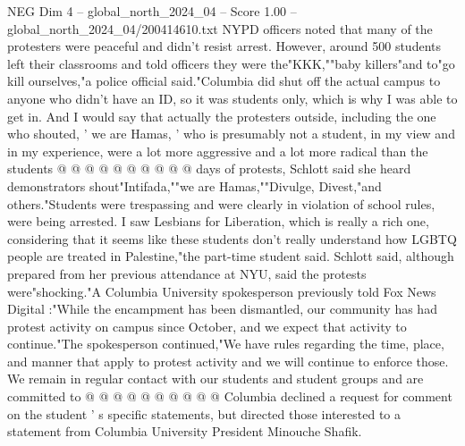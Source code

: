\begin{textsample}{NEG Dim 4 – global\_north\_2024\_04 – Score 1.00 – global\_north\_2024\_04/200414610.txt}
NYPD officers noted that many of the protesters were peaceful and didn't resist arrest.
However, around 500 students left their classrooms and told officers they were the"KKK,""baby killers"and to"go kill ourselves,"a police official said."Columbia did shut off the actual campus to anyone who didn't have an ID, so it was students only, which is why I was able to get in.
And I would say that actually the protesters outside, including the one who shouted, ' we are Hamas, ' who is presumably not a student, in my view and in my experience, were a lot more aggressive and a lot more radical than the students @ @ @ @ @ @ @ @ @ @ days of protests, Schlott said she heard demonstrators shout"Intifada,""we are Hamas,""Divulge, Divest,"and others."Students were trespassing and were clearly in violation of school rules, were being arrested.
I saw Lesbians for Liberation, which is really a rich one, considering that it seems like these students don't really understand how LGBTQ people are treated in Palestine,"the part-time student said.
Schlott said, although prepared from her previous attendance at NYU, said the protests were"shocking."A Columbia University spokesperson previously told Fox News Digital :"While the encampment has been dismantled, our community has had protest activity on campus since October, and we expect that activity to continue."The spokesperson continued,"We have rules regarding the time, place, and manner that apply to protest activity and we will continue to enforce those.
We remain in regular contact with our students and student groups and are committed to @ @ @ @ @ @ @ @ @ @ Columbia declined a request for comment on the student ' s specific statements, but directed those interested to a statement from Columbia University President Minouche Shafik.

\end{textsample}
